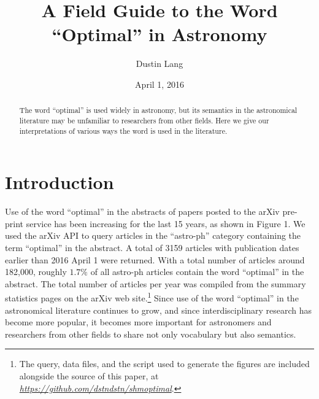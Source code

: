 \documentclass[12pt, preprint]{aastex}
\newcommand{\niceurl}[1]{\href{#1}{\textsl{#1}}}
\begin{document}
\title{A Field Guide to the Word ``Optimal'' in Astronomy}

\author{%
Dustin Lang%
}
\date{\centering April 1, 2016}

\begin{abstract}
The word ``optimal'' is used widely in astronomy, but its semantics
in the astronomical literature
may be unfamiliar to researchers from other fields.  Here we give
our interpretations of various ways the word is used in the literature.
\end{abstract}


\section{Introduction}

Use of the word ``optimal'' in the abstracts of papers posted to the
arXiv pre-print service has been increasing for the last 15 years, as
shown in Figure 1.  We used the arXiv API to query articles in the
``astro-ph'' category containing the term ``optimal'' in the abstract.
A total of 3159 articles with publication dates earlier than 2016
April 1 were returned.  With a total number of articles around
182,000, roughly $1.7\%$ of all astro-ph articles contain the word
``optimal'' in the abstract.  The total number of articles per year
was compiled from the summary statistics pages on the arXiv web
site.\footnote{The query, data files, and the script used to generate
  the figures are included alongside the source of this paper, at
  \niceurl{https://github.com/dstndstn/shmoptimal}.}  Since use of the
word ``optimal'' in the astronomical literature continues to grow, and
since interdisciplinary research has become more popular, it becomes
more important for astronomers and researchers from other fields to
share not only vocabulary but also semantics.
\end{document}
